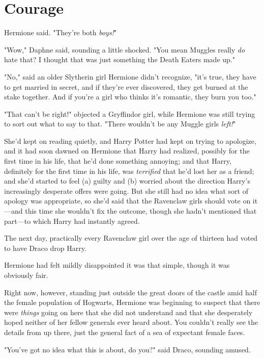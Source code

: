 \chapter{Courage}

 Hermione said. "They're both \emph{boys!}"

"Wow," Daphne said, sounding a little shocked. "You mean Muggles really
\emph{do} hate that? I thought that was just something the Death Eaters made
up."

"No," said an older Slytherin girl Hermione didn't recognize, "it's true, they
have to get married in secret, and if they're ever discovered, they get burned
at the stake together. And if you're a girl who thinks it's romantic, they burn
you too."

"That can't be right!" objected a Gryffindor girl, while Hermione was still
trying to sort out what to say to that. "There wouldn't be any Muggle girls
\emph{left!}"

She'd kept on reading quietly, and Harry Potter had kept on trying to
apologize, and it had soon dawned on Hermione that Harry had realized, possibly
for the first time in his life, that he'd done something annoying; and that
Harry, definitely for the first time in his life, was \emph{terrified} that
he'd lost her as a friend; and she'd started to feel (a) guilty and (b) worried
about the direction Harry's increasingly desperate offers were going. But she
still had no idea what sort of apology was appropriate, so she'd said that the
Ravenclaw girls should vote on it---and this time she wouldn't fix the outcome,
though she hadn't mentioned that part---to which Harry had instantly agreed.

The next day, practically every Ravenclaw girl over the age of thirteen had
voted to have Draco drop Harry.

Hermione had felt mildly disappointed it was that simple, though it was
obviously fair.

Right now, however, standing just outside the great doors of the castle amid
half the female population of Hogwarts, Hermione was beginning to suspect that
there were \emph{things} going on here that she did not understand and that she
desperately hoped neither of her fellow generals ever heard about.
\sbreak
You couldn't really see the details from up there, just the general fact of a
sea of expectant female faces.

"You've got no idea what this is about, do you?" said Draco, sounding amused.

